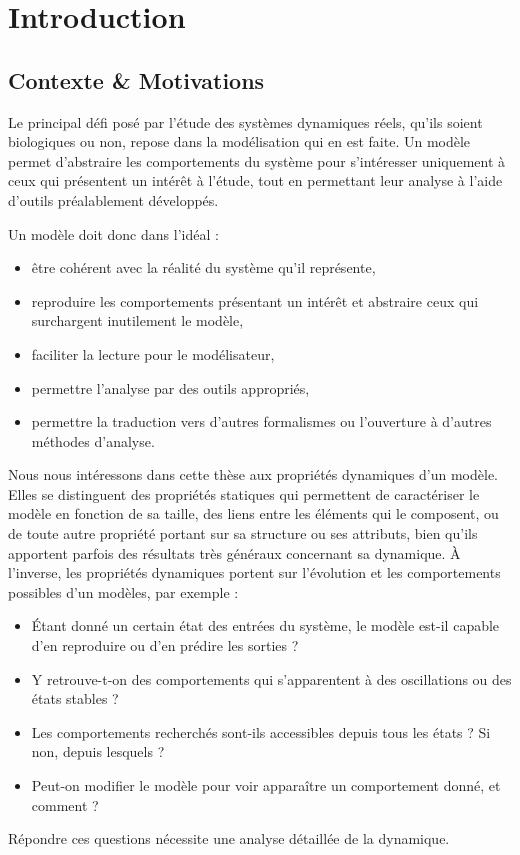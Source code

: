 
\chapter{Introduction}

\section{Contexte \& Motivations}

Le principal défi posé par l'étude des systèmes dynamiques réels,
qu'ils soient biologiques ou non,
repose dans la modélisation qui en est faite.
Un modèle permet d'abstraire les comportements du système
pour s'intéresser uniquement à ceux qui présentent un intérêt à l'étude,
tout en permettant leur analyse à l'aide d'outils préalablement développés.

Un modèle doit donc dans l'idéal :
\begin{itemize}
  \item être cohérent avec la réalité du système qu'il représente,
  \item reproduire les comportements présentant un intérêt
    et abstraire ceux qui surchargent inutilement le modèle,
  \item faciliter la lecture pour le modélisateur,
  \item permettre l'analyse par des outils appropriés,
  \item permettre la traduction vers d'autres formalismes
    ou l'ouverture à d'autres méthodes d'analyse.
\end{itemize}

Nous nous intéressons dans cette thèse aux propriétés dynamiques d'un modèle.
Elles se distinguent des propriétés statiques qui permettent de caractériser le modèle
en fonction de sa taille,
des liens entre les éléments qui le composent,
ou de toute autre propriété portant sur sa structure ou ses attributs,
bien qu'ils apportent parfois des résultats très généraux concernant sa dynamique.
À l'inverse, les propriétés dynamiques portent sur l'évolution et les comportements
possibles d'un modèles, par exemple :
\begin{itemize}
  \item Étant donné un certain état des entrées du système, le modèle est-il capable
    d'en reproduire ou d'en prédire les sorties ?
  \item Y retrouve-t-on des comportements qui s'apparentent à des oscillations
    ou des états stables ?
  \item Les comportements recherchés sont-ils accessibles depuis tous les états ?
    Si non, depuis lesquels ?
  \item Peut-on modifier le modèle pour voir apparaître un comportement donné, et comment ?
\end{itemize}
Répondre ces questions nécessite une analyse détaillée de la dynamique.

